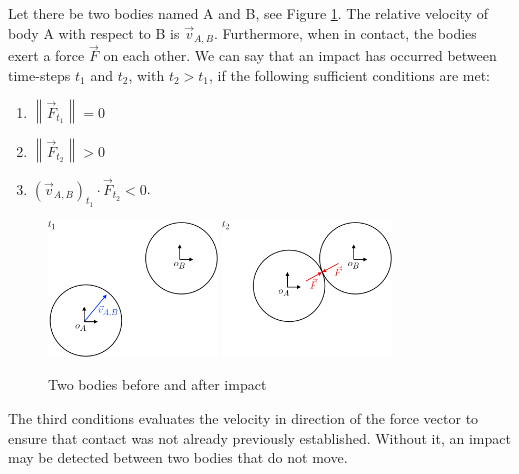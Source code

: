 \documentclass[11pt]{report}
\numberwithin{equation}{section}        %
\numberwithin{figure}{section}          %
\numberwithin{table}{section}           %
\begin{document}
  Let there be two bodies named A and B, see Figure \ref{fig:bodies}. The relative velocity of body A with respect to B is $\vec{v}_{A,B}$. Furthermore, when in contact, the bodies exert a force $\vec{F}$ on each other. We can say that an impact has occurred between time-steps $t_1$ and $t_2$, with $t_2>t_1$, if the following sufficient conditions are met:
\begin{enumerate}
  \item $\left \| \vec{F}_{t_1} \right \|= 0$
  \item $\left \| \vec{F}_{t_2} \right \|> 0$
  \item $(\vec{v}_{A,B})_{t_1} \cdot \vec{F}_{t_2} < 0$.  
\end{enumerate}
  
 \begin{figure}[]
  \centering
  \includegraphics[width=0.4\textwidth]{Graphics/1.png}\hfill
  \includegraphics[width=0.4\textwidth]{Graphics/2.png}
  \caption{Two bodies before and after impact}
  \label{fig:bodies}
  \end{figure}

  The third conditions evaluates the velocity in direction of the force vector to ensure that contact was not already previously established. Without it, an impact may be detected between two bodies that do not move.
\end{document}
